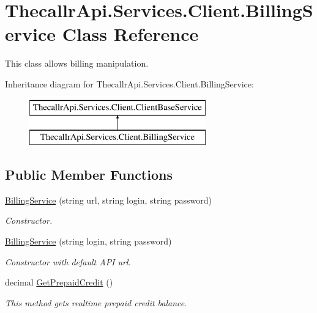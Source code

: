 \hypertarget{class_thecallr_api_1_1_services_1_1_client_1_1_billing_service}{\section{Thecallr\+Api.\+Services.\+Client.\+Billing\+Service Class Reference}
\label{class_thecallr_api_1_1_services_1_1_client_1_1_billing_service}
}


This class allows billing manipulation.  


Inheritance diagram for Thecallr\+Api.\+Services.\+Client.\+Billing\+Service\+:\begin{figure}[H]
\begin{center}
\leavevmode
\includegraphics[height=2.000000cm]{class_thecallr_api_1_1_services_1_1_client_1_1_billing_service}
\end{center}
\end{figure}
\subsection*{Public Member Functions}
\begin{DoxyCompactItemize}
\item 
\hyperlink{class_thecallr_api_1_1_services_1_1_client_1_1_billing_service_a501a2ae9dc6094bf0233f2de26ece543}{Billing\+Service} (string url, string login, string password)
\begin{DoxyCompactList}\small\item\em Constructor. \end{DoxyCompactList}\item 
\hyperlink{class_thecallr_api_1_1_services_1_1_client_1_1_billing_service_ab03982d15aaa56cd39e90aef35b967bd}{Billing\+Service} (string login, string password)
\begin{DoxyCompactList}\small\item\em Constructor with default A\+P\+I url. \end{DoxyCompactList}\item 
decimal \hyperlink{class_thecallr_api_1_1_services_1_1_client_1_1_billing_service_af8f6a6a3b184630ddad9a738eea39342}{Get\+Prepaid\+Credit} ()
\begin{DoxyCompactList}\small\item\em This method gets realtime prepaid credit balance. \end{DoxyCompactList}\end{DoxyCompactItemize}
